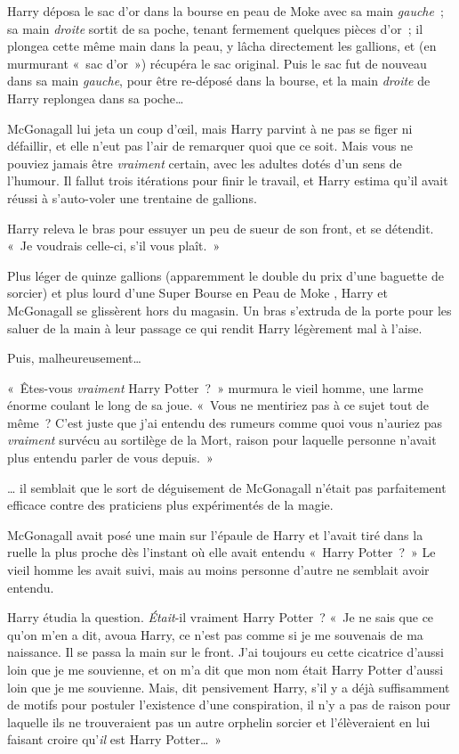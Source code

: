Harry déposa le sac d'or dans la bourse en peau de Moke avec sa main \emph{gauche}~; sa main \emph{droite} sortit de sa poche, tenant fermement quelques pièces d'or~; il plongea cette même main dans la peau, y lâcha directement les gallions, et (en murmurant «~sac d'or~») récupéra le sac original. Puis le sac fut de nouveau dans sa main \emph{gauche}, pour être re-déposé dans la bourse, et la main \emph{droite} de Harry replongea dans sa poche…

McGonagall lui jeta un coup d'œil, mais Harry parvint à ne pas se figer ni défaillir, et elle n'eut pas l'air de remarquer quoi que ce soit. Mais vous ne pouviez jamais être \emph{vraiment} certain, avec les adultes dotés d'un sens de l'humour. Il fallut trois itérations pour finir le travail, et Harry estima qu'il avait réussi à s'auto-voler une trentaine de gallions.

Harry releva le bras pour essuyer un peu de sueur de son front, et se détendit. «~Je voudrais celle-ci, s'il vous plaît.~»

Plus léger de quinze gallions (apparemment le double du prix d'une baguette de sorcier) et plus lourd d'une Super Bourse en Peau de Moke , Harry et McGonagall se glissèrent hors du magasin. Un bras s'extruda de la porte pour les saluer de la main à leur passage ce qui rendit Harry légèrement mal à l'aise.

Puis, malheureusement…

«~Êtes-vous \emph{vraiment} Harry Potter~?~» murmura le vieil homme, une larme énorme coulant le long de sa joue. «~Vous ne mentiriez pas à ce sujet tout de même~? C'est juste que j'ai entendu des rumeurs comme quoi vous n'auriez pas \emph{vraiment} survécu au sortilège de la Mort, raison pour laquelle personne n'avait plus entendu parler de vous depuis.~»

… il semblait que le sort de déguisement de McGonagall n'était pas parfaitement efficace contre des praticiens plus expérimentés de la magie.

McGonagall avait posé une main sur l'épaule de Harry et l'avait tiré dans la ruelle la plus proche dès l'instant où elle avait entendu «~Harry Potter~?~» Le vieil homme les avait suivi, mais au moins personne d'autre ne semblait avoir entendu.

Harry étudia la question. \emph{Était}-il vraiment Harry Potter~? «~Je ne sais que ce qu'on m'en a dit, avoua Harry, ce n'est pas comme si je me souvenais de ma naissance. Il se passa la main sur le front. J'ai toujours eu cette cicatrice d'aussi loin que je me souvienne, et on m'a dit que mon nom était Harry Potter d'aussi loin que je me souvienne. Mais, dit pensivement Harry, s'il y a déjà suffisamment de motifs pour postuler l'existence d'une conspiration, il n'y a pas de raison pour laquelle ils ne trouveraient pas un autre orphelin sorcier et l'élèveraient en lui faisant croire qu'\emph{il} est Harry Potter…~»

